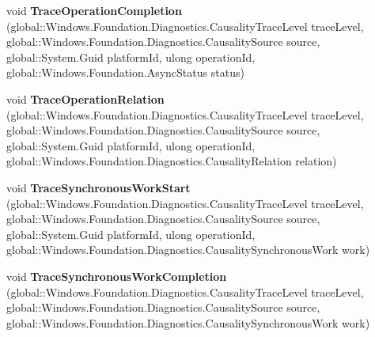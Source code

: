\begin{DoxyCompactItemize}
\item 
\mbox{\label{interface_windows_1_1_foundation_1_1_diagnostics_1_1_i_async_causality_tracer_statics_ac5e3ac3c90be930394f03ec531d863cd}} 
void {\bfseries Trace\+Operation\+Completion} (global\+::\+Windows.\+Foundation.\+Diagnostics.\+Causality\+Trace\+Level trace\+Level, global\+::\+Windows.\+Foundation.\+Diagnostics.\+Causality\+Source source, global\+::\+System.\+Guid platform\+Id, ulong operation\+Id, global\+::\+Windows.\+Foundation.\+Async\+Status status)
\item 
\mbox{\label{interface_windows_1_1_foundation_1_1_diagnostics_1_1_i_async_causality_tracer_statics_ad69dacbb1c6dd0ede745f227c69d8d16}} 
void {\bfseries Trace\+Operation\+Relation} (global\+::\+Windows.\+Foundation.\+Diagnostics.\+Causality\+Trace\+Level trace\+Level, global\+::\+Windows.\+Foundation.\+Diagnostics.\+Causality\+Source source, global\+::\+System.\+Guid platform\+Id, ulong operation\+Id, global\+::\+Windows.\+Foundation.\+Diagnostics.\+Causality\+Relation relation)
\item 
\mbox{\label{interface_windows_1_1_foundation_1_1_diagnostics_1_1_i_async_causality_tracer_statics_a749785813f9caf99b9ac0f4fd89700a2}} 
void {\bfseries Trace\+Synchronous\+Work\+Start} (global\+::\+Windows.\+Foundation.\+Diagnostics.\+Causality\+Trace\+Level trace\+Level, global\+::\+Windows.\+Foundation.\+Diagnostics.\+Causality\+Source source, global\+::\+System.\+Guid platform\+Id, ulong operation\+Id, global\+::\+Windows.\+Foundation.\+Diagnostics.\+Causality\+Synchronous\+Work work)
\item 
\mbox{\label{interface_windows_1_1_foundation_1_1_diagnostics_1_1_i_async_causality_tracer_statics_a1543ef1de5733e88b1cf2a3424c199f5}} 
void {\bfseries Trace\+Synchronous\+Work\+Completion} (global\+::\+Windows.\+Foundation.\+Diagnostics.\+Causality\+Trace\+Level trace\+Level, global\+::\+Windows.\+Foundation.\+Diagnostics.\+Causality\+Source source, global\+::\+Windows.\+Foundation.\+Diagnostics.\+Causality\+Synchronous\+Work work)
\item 

\end{DoxyCompactItemize}
